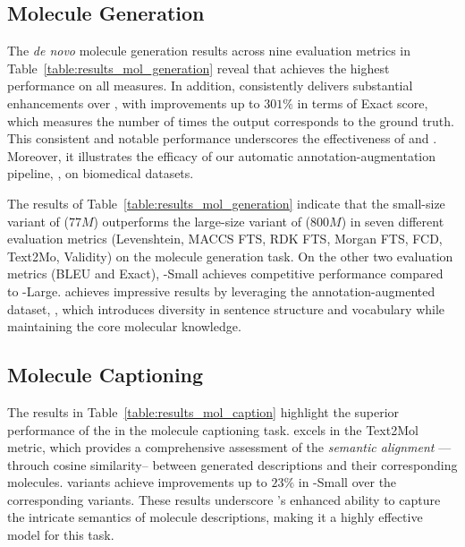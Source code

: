 \subsection{Molecule Generation}
\label{subsec:molecule_generation}




The \emph{de novo} molecule generation results across nine evaluation metrics in Table~\ref{table:results_mol_generation} reveal that \newmodel achieves the highest performance on all measures.
In addition, \newmodel consistently delivers substantial enhancements over \oldmodel, with improvements up to $301\%$ in terms of Exact score, which measures the number of times the output corresponds to the ground truth. 
This consistent and notable performance underscores the effectiveness of \newdataset and \newmodel. 
Moreover, it illustrates the efficacy of our automatic annotation-augmentation pipeline, \pipeline, on biomedical datasets.

The results of Table~\ref{table:results_mol_generation} indicate that the small-size variant of \newmodel ($77M$) outperforms the large-size variant of \oldmodel ($800M$) in seven different evaluation metrics (Levenshtein, MACCS FTS, RDK FTS, Morgan FTS, FCD, Text2Mo, Validity) on the molecule generation task.
On the other two evaluation metrics (BLEU and Exact), \newmodel-Small achieves competitive performance compared to \oldmodel-Large. 
\newmodel achieves impressive results by leveraging the annotation-augmented dataset, \newdataset, which introduces diversity in sentence structure and vocabulary while maintaining the core molecular knowledge. 

\subsection{Molecule Captioning}
\label{subsec:molecule_captioning}




The results in Table~\ref{table:results_mol_caption} highlight the superior performance of the \newmodel in the molecule captioning task. 
\newmodel excels in the Text2Mol metric, which provides a comprehensive assessment of the \textit{semantic alignment} ---throuch cosine similarity-- between generated descriptions and their corresponding molecules.
\newmodel variants achieve improvements up to $23\%$ in \newmodel-Small over the corresponding \oldmodel variants. 
These results underscore \newmodel’s enhanced ability to capture the intricate semantics of molecule descriptions, making it a highly effective model for this task.

